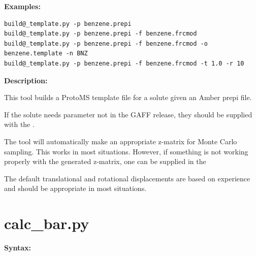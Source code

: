 \documentclass[letterpaper,10pt,english]{manual}
\begin{document}
\textbf{Examples:}

\begin{Verbatim}[commandchars=@\[\]]
build@_template.py -p benzene.prepi
build@_template.py -p benzene.prepi -f benzene.frcmod
build@_template.py -p benzene.prepi -f benzene.frcmod -o benzene.template -n BNZ
build@_template.py -p benzene.prepi -f benzene.frcmod -t 1.0 -r 10
\end{Verbatim}

\textbf{Description:}

This tool builds a ProtoMS template file for a solute given an Amber prepi file.

If the solute needs parameter not in the GAFF release, they should be supplied with the .

The tool will automatically make an appropriate z-matrix for Monte Carlo sampling. This works in most situations. However, if something is not working properly with the generated z-matrix, one can be supplied in the 

The default translational and rotational displacements are based on experience and should be appropriate in most situations.


\section{calc\_bar.py}

\textbf{Syntax:}
\end{document}

